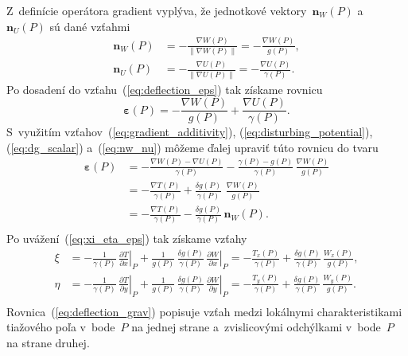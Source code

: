 \documentclass[a4paper,12pt]{book}
\let\vec\mathbf
\begin{document}
Z~definície operátora gradient vyplýva, že jednotkové vektory~$\vec n_W(P)$ 
a~$\vec n_U(P)$ sú dané vzťahmi
%
\begin{equation}
\label{eq:nw_nu}
\begin{split}
\vec n_W(P) &= -\frac{\nabla W(P)}{\| \nabla W(P) \|} = -\frac{\nabla 
W(P)}{g(P)}{,}\\
%
\vec n_U(P) &= -\frac{\nabla U(P)}{\| \nabla U(P) \|} = -\frac{\nabla 
U(P)}{\gamma(P)}{.}
\end{split}
\end{equation}
%
Po dosadení do vzťahu~(\ref{eq:deflection_eps}) tak získame rovnicu
%
\begin{equation}
\label{eq:deflection_eps2}
\boldsymbol\varepsilon(P) = -\frac{\nabla W(P)}{g(P)} + \frac{\nabla 
U(P)}{\gamma(P)}{.}
\end{equation}
%
S~využitím vzťahov~(\ref{eq:gradient_additivity}), 
(\ref{eq:disturbing_potential}),  (\ref{eq:dg_scalar}) a~(\ref{eq:nw_nu}) 
môžeme ďalej upraviť túto rovnicu do tvaru
%
\begin{equation}
\label{eq:deflection_eps3}
\begin{split}
\boldsymbol\varepsilon(P) &= - \frac{\nabla W(P) - \nabla U(P)}{\gamma(P)} 
- \frac{\gamma(P) - g(P)}{\gamma(P)} \, \frac{\nabla W(P)}{g(P)}\\
%
&= - \frac{\nabla T(P)}{\gamma(P)} + \frac{\delta g(P)}{\gamma(P)} \,  \, 
\frac{\nabla W(P)}{g(P)}\\
%
&= - \frac{\nabla T(P)}{\gamma(P)} - \frac{\delta g(P)}{\gamma(P)} \, \vec 
n_W(P){.}\\
\end{split}
\end{equation}
%
Po uvážení~(\ref{eq:xi_eta_eps}) tak získame vzťahy
%
\begin{equation}
\label{eq:deflection_grav}
\begin{split}
\xi &= -\frac{1}{\gamma(P)} \, \left.\frac{\partial T}{\partial x}\right|_{P} 
+ \frac{1}{g(P)} \, \frac{\delta g(P)}{\gamma(P)} \, \left.\frac{\partial 
W}{\partial x}\right|_P = -\frac{T_x(P)}{\gamma(P)} + \frac{\delta 
g(P)}{\gamma(P)} \, \frac{W_x(P)}{g(P)}{,}\\
%
\eta &= -\frac{1}{\gamma(P)} \, \left.\frac{\partial T}{\partial y}\right|_{P} 
+ \frac{1}{g(P)} \, \frac{\delta g(P)}{\gamma(P)} \, \left.\frac{\partial 
W}{\partial y}\right|_P= -\frac{T_y(P)}{\gamma(P)} + \frac{\delta 
g(P)}{\gamma(P)} \, \frac{W_y(P)}{g(P)}{.}\\
\end{split}
\end{equation}
%
Rovnica~(\ref{eq:deflection_grav}) popisuje vzťah medzi lokálnymi 
charakteristikami tiažového poľa v~bode~$P$ na jednej strane a~zvislicovými 
odchýlkami v~bode~$P$ na strane druhej.
\end{document}
